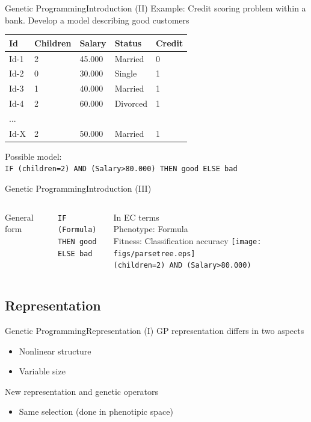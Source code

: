 \documentclass[10pt,compress]{beamer} %
\begin{document}
\begin{frame}{Genetic Programming}{Introduction (II)}
	Example: Credit scoring problem within a bank.  Develop a model describing good customers

	\begin{table}[]
	\centering
		\begin{tabular}{|l|l|l|l|l|}
		\hline
		Id 	 & Children & Salary & Status & Credit \\ \hline
 		Id-1 & 2 	& 45.000 & Married & 0 \\ \hline
  		Id-2 & 0 	& 30.000 & Single & 1 \\ \hline
   		Id-3 & 1 	& 40.000 & Married & 1 \\ \hline
   		Id-4 & 2 	& 60.000 & Divorced & 1 \\ \hline
   		 ... &  	&  &  &  \\ \hline
   		Id-X & 2 	& 50.000 & Married & 1  \\ \hline
		\end{tabular}
	\end{table}

	   Possible model:\\
	   \texttt{IF (children=2) AND (Salary>80.000) THEN good ELSE bad}
\end{frame}

\begin{frame}{Genetic Programming}{Introduction (III)}
    \begin{columns}
	  	General form\\
			\begin{center}
	   		\texttt{IF (Formula) \\THEN good \\ELSE bad}\\
	  		\end{center} 
	   In EC terms\\
	   Phenotype: Formula\\
	   Fitness: Classification accuracy
		\texttt{[image: figs/parsetree.eps]}\\\bigskip
	   \centering\small{\texttt{(children=2) AND (Salary>80.000)}}
	\end{columns}
\end{frame}

\subsection{Representation}
\begin{frame}{Genetic Programming}{Representation (I)}
	GP representation differs in two aspects
	\begin{itemize}
		\item Nonlinear structure
		\item Variable size
	\end{itemize}
	New representation and genetic operators
	\begin{itemize}
		\item Same selection (done in phenotipic space)
	\end{itemize}
\end{frame}
\end{document}
